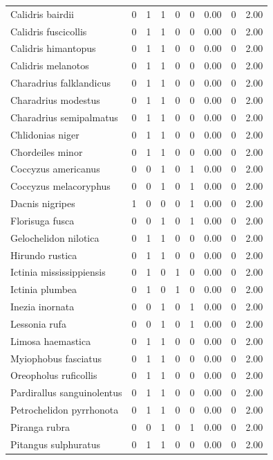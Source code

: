 \documentclass[
]{scrbook}
\begin{document}
\begin{table}
\begin{tabular}{lrrrrrrrr}
\addlinespace
Calidris bairdii & 0 & 1 & 1 & 0 & 0 & 0.00 & 0 & 2.00\\
Calidris fuscicollis & 0 & 1 & 1 & 0 & 0 & 0.00 & 0 & 2.00\\
Calidris himantopus & 0 & 1 & 1 & 0 & 0 & 0.00 & 0 & 2.00\\
Calidris melanotos & 0 & 1 & 1 & 0 & 0 & 0.00 & 0 & 2.00\\
Charadrius falklandicus & 0 & 1 & 1 & 0 & 0 & 0.00 & 0 & 2.00\\
\addlinespace
Charadrius modestus & 0 & 1 & 1 & 0 & 0 & 0.00 & 0 & 2.00\\
Charadrius semipalmatus & 0 & 1 & 1 & 0 & 0 & 0.00 & 0 & 2.00\\
Chlidonias niger & 0 & 1 & 1 & 0 & 0 & 0.00 & 0 & 2.00\\
Chordeiles minor & 0 & 1 & 1 & 0 & 0 & 0.00 & 0 & 2.00\\
Coccyzus americanus & 0 & 0 & 1 & 0 & 1 & 0.00 & 0 & 2.00\\
\addlinespace
Coccyzus melacoryphus & 0 & 0 & 1 & 0 & 1 & 0.00 & 0 & 2.00\\
Dacnis nigripes & 1 & 0 & 0 & 0 & 1 & 0.00 & 0 & 2.00\\
Florisuga fusca & 0 & 0 & 1 & 0 & 1 & 0.00 & 0 & 2.00\\
Gelochelidon nilotica & 0 & 1 & 1 & 0 & 0 & 0.00 & 0 & 2.00\\
Hirundo rustica & 0 & 1 & 1 & 0 & 0 & 0.00 & 0 & 2.00\\
\addlinespace
Ictinia mississippiensis & 0 & 1 & 0 & 1 & 0 & 0.00 & 0 & 2.00\\
Ictinia plumbea & 0 & 1 & 0 & 1 & 0 & 0.00 & 0 & 2.00\\
Inezia inornata & 0 & 0 & 1 & 0 & 1 & 0.00 & 0 & 2.00\\
Lessonia rufa & 0 & 0 & 1 & 0 & 1 & 0.00 & 0 & 2.00\\
Limosa haemastica & 0 & 1 & 1 & 0 & 0 & 0.00 & 0 & 2.00\\
\addlinespace
Myiophobus fasciatus & 0 & 1 & 1 & 0 & 0 & 0.00 & 0 & 2.00\\
Oreopholus ruficollis & 0 & 1 & 1 & 0 & 0 & 0.00 & 0 & 2.00\\
Pardirallus sanguinolentus & 0 & 1 & 1 & 0 & 0 & 0.00 & 0 & 2.00\\
Petrochelidon pyrrhonota & 0 & 1 & 1 & 0 & 0 & 0.00 & 0 & 2.00\\
Piranga rubra & 0 & 0 & 1 & 0 & 1 & 0.00 & 0 & 2.00\\
\addlinespace
Pitangus sulphuratus & 0 & 1 & 1 & 0 & 0 & 0.00 & 0 & 2.00\\

\end{tabular}
\end{table}
\end{document}
